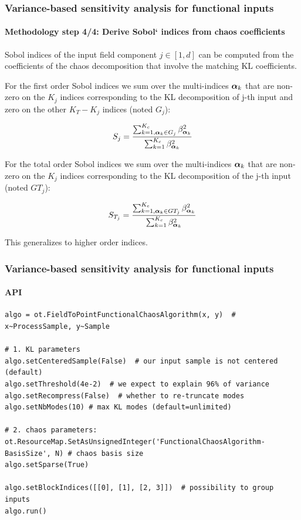 \documentclass[aspectratio=169]{beamer}
\begin{document}
\begin{frame}
\frametitle{Variance-based sensitivity analysis for functional inputs}

\framesubtitle{Methodology step 4/4: Derive Sobol` indices from chaos coefficients}

Sobol indices of the input field component $j \in [1,d]$ can be computed
from the coefficients of the chaos decomposition that involve the
matching KL coefficients.

For the first order Sobol indices we sum over the multi-indices ${\mathbf{\boldsymbol{{\alpha}}}}_k$
that are non-zero on the $K_j$ indices corresponding to the KL
decomposition of j-th input and zero on the other $K_T - K_j$ indices (noted $G_j$):

$$
S_j = \frac{\sum_{k=1, {\mathbf{\boldsymbol{{\alpha}}}}_k \in G_j}^{K_c} \beta_{{\mathbf{\boldsymbol{{\alpha}}}}_k}^2}{\sum_{k=1}^{K_c} \beta_{{\mathbf{\boldsymbol{{\alpha}}}}_k}^2}
$$

For the total order Sobol indices we sum over the multi-indices ${\mathbf{\boldsymbol{{\alpha}}}}_k$
that are non-zero on the $K_j$ indices corresponding to the KL
decomposition of the j-th input (noted $GT_j$):

$$
S_{T_j} = \frac{\sum_{k=1, {\mathbf{\boldsymbol{{\alpha}}}}_k \in GT_j}^{K_c} \beta_{{\mathbf{\boldsymbol{{\alpha}}}}_k}^2}{\sum_{k=1}^{K_c} \beta_{{\mathbf{\boldsymbol{{\alpha}}}}_k}^2} 
$$

This generalizes to higher order indices.

\end{frame}


\begin{frame}[containsverbatim]
\frametitle{Variance-based sensitivity analysis for functional inputs}

\framesubtitle{API}

\lstset{language=python}
\begin{lstlisting}
algo = ot.FieldToPointFunctionalChaosAlgorithm(x, y)  # x~ProcessSample, y~Sample

# 1. KL parameters
algo.setCenteredSample(False)  # our input sample is not centered (default)
algo.setThreshold(4e-2)  # we expect to explain 96% of variance
algo.setRecompress(False)  # whether to re-truncate modes
algo.setNbModes(10) # max KL modes (default=unlimited)

# 2. chaos parameters:
ot.ResourceMap.SetAsUnsignedInteger('FunctionalChaosAlgorithm-BasisSize', N) # chaos basis size
algo.setSparse(True)

algo.setBlockIndices([[0], [1], [2, 3]])  # possibility to group inputs
algo.run()
\end{lstlisting}

\end{frame}
\end{document}
